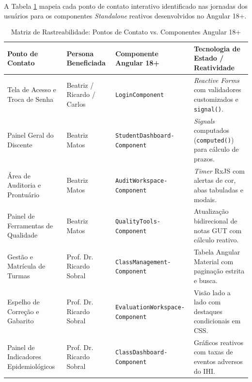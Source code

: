 A Tabela \ref{tab_touchpoints_componentes} mapeia cada ponto de contato interativo identificado nas jornadas dos usuários para os componentes \textit{Standalone} reativos desenvolvidos no Angular 18+.

\begin{table}[!ht]
\centering
\caption{Matriz de Rastreabilidade: Pontos de Contato vs. Componentes Angular 18+}
\label{tab_touchpoints_componentes}
\footnotesize
\begin{tabularx}{\textwidth}{p{2.8cm} p{2.8cm} p{4.8cm} X}
\toprule
\textbf{Ponto de Contato} & \textbf{Persona Beneficiada} & \textbf{Componente Angular 18+} & \textbf{Tecnologia de Estado / Reatividade} \\
\midrule
Tela de Acesso e Troca de Senha & Beatriz / Ricardo / Carlos & \texttt{LoginComponent} & \textit{Reactive Forms} com validadores customizados e \texttt{signal()}. \\
\addlinespace
Painel Geral do Discente & Beatriz Matos & \texttt{StudentDashboard-}\linebreak\texttt{Component} & \textit{Signals} computados (\texttt{computed()}) para cálculo de prazos. \\
\addlinespace
Área de Auditoria e Prontuário & Beatriz Matos & \texttt{AuditWorkspace-}\linebreak\texttt{Component} & \textit{Timer} RxJS com alertas de cor, abas tabuladas e modais. \\
\addlinespace
Painel de Ferramentas de Qualidade & Beatriz Matos & \texttt{QualityTools-}\linebreak\texttt{Component} & Atualização bidirecional de notas GUT com cálculo reativo. \\
\addlinespace
Gestão e Matrícula de Turmas & Prof. Dr. Ricardo Sobral & \texttt{ClassManagement-}\linebreak\texttt{Component} & Tabela Angular Material com paginação estrita e busca. \\
\addlinespace
Espelho de Correção e Gabarito & Prof. Dr. Ricardo Sobral & \texttt{EvaluationWorkspace-}\linebreak\texttt{Component} & Visão lado a lado com destaques condicionais em CSS. \\
\addlinespace
Painel de Indicadores Epidemiológicos & Prof. Dr. Ricardo Sobral & \texttt{ClassDashboard-}\linebreak\texttt{Component} & Gráficos reativos com taxas de eventos adversos do IHI. \\
\bottomrule
\end{tabularx}
\end{table}
